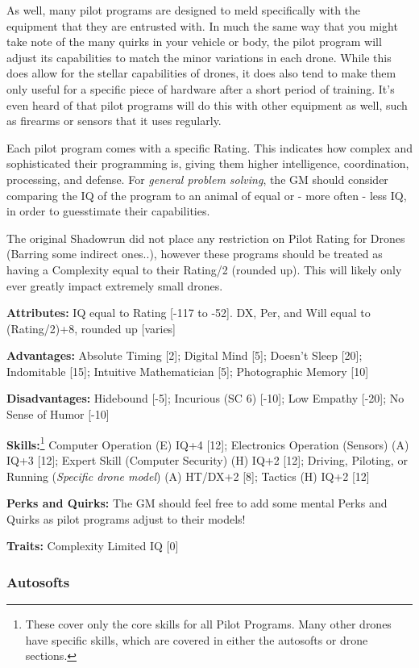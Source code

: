 As well, many pilot programs are designed to meld specifically with the equipment that they are entrusted with. In much the same way that you might take note of the many quirks in your vehicle or body, the pilot program will adjust its capabilities to match the minor variations in each drone. While this does allow for the stellar capabilities of drones, it does also tend to make them only useful for a specific piece of hardware after a short period of training. It's even heard of that pilot programs will do this with other equipment as well, such as firearms or sensors that it uses regularly.

Each pilot program comes with a specific Rating. This indicates how complex and sophisticated their programming is, giving them higher intelligence, coordination, processing, and defense. For \textit{general problem solving}, the GM should consider comparing the IQ of the program to an animal of equal or - more often - less IQ, in order to guesstimate their capabilities.

The original Shadowrun did not place any restriction on Pilot Rating for Drones (Barring some indirect ones..), however these programs should be treated as having a Complexity equal to their Rating/2 (rounded up). This will likely only ever greatly impact extremely small drones.

\textbf{Attributes:} 
IQ equal to Rating [-117 to -52]. DX, Per, and Will equal to (Rating/2)+8, rounded up [varies]

\textbf{Advantages:} 
Absolute Timing [2]; Digital Mind [5]; Doesn't Sleep [20]; Indomitable [15]; Intuitive Mathematician [5]; Photographic Memory [10]

\textbf{Disadvantages:} 
Hidebound [-5]; Incurious (SC 6) [-10]; Low Empathy [-20]; No Sense of Humor [-10]

\textbf{Skills:}\footnote{These cover only the core skills for all Pilot Programs. Many other drones have specific skills, which are covered in either the autosofts or drone sections.}
Computer Operation (E) IQ+4 [12]; Electronics Operation (Sensors) (A) IQ+3 [12]; Expert Skill (Computer Security) (H) IQ+2 [12]; Driving, Piloting, or Running (\textit{Specific drone model}) (A) HT/DX+2 [8]; Tactics (H) IQ+2 [12]

\textbf{Perks and Quirks:}
The GM should feel free to add some mental Perks and Quirks as pilot programs adjust to their models!

\textbf{Traits:}
Complexity Limited IQ [0]

\subsubsection{Autosofts}\label{autosofts}

